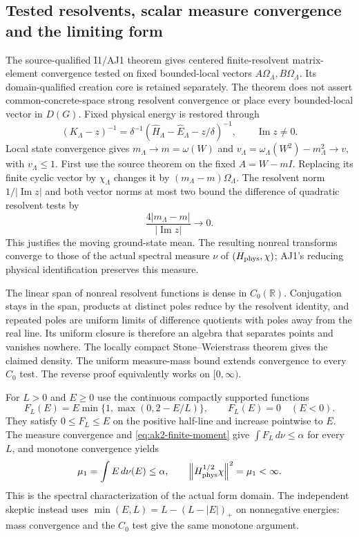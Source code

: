 \subsection{Tested resolvents, scalar measure convergence and the limiting form}
The source-qualified I1/AJ1 theorem gives centered finite-resolvent matrix-element convergence tested on fixed bounded-local vectors $A\Omega_\Lambda,B\Omega_\Lambda$. Its domain-qualified creation core is retained separately. The theorem does not assert common-concrete-space strong resolvent convergence or place every bounded-local vector in $D(G)$. Fixed physical energy is restored through
\begin{equation}
 (K_\Lambda-z)^{-1}=\delta^{-1}
  (\widehat H_\Lambda-\widehat E_\Lambda-z/\delta)^{-1},
 \qquad\operatorname{Im}z\ne0.
 \label{eq:ak2-rescale}
\end{equation}
Local state convergence gives $m_\Lambda\to m=\omega(W)$ and $v_\Lambda=\omega_\Lambda(W^2)-m_\Lambda^2\to v$, with $v_\Lambda\le1$. First use the source theorem on the fixed $A=W-mI$. Replacing its finite cyclic vector by $\chi_\Lambda$ changes it by $(m_\Lambda-m)\Omega_\Lambda$. The resolvent norm $1/|\operatorname{Im}z|$ and both vector norms at most two bound the difference of quadratic resolvent tests by
\begin{equation}
 \frac{4|m_\Lambda-m|}{|\operatorname{Im}z|}\longrightarrow0.
 \label{eq:ak2-moving-center}
\end{equation}
This justifies the moving ground-state mean. The resulting nonreal transforms converge to those of the actual spectral measure $\nu$ of $(H_{\rm phys},\chi)$; AJ1's reducing physical identification preserves this measure.

The linear span of nonreal resolvent functions is dense in $C_0(\mathbb R)$. Conjugation stays in the span, products at distinct poles reduce by the resolvent identity, and repeated poles are uniform limits of difference quotients with poles away from the real line. Its uniform closure is therefore an algebra that separates points and vanishes nowhere. The locally compact Stone--Weierstrass theorem gives the claimed density. The uniform measure-mass bound extends convergence to every $C_0$ test. The reverse proof equivalently works on $[0,\infty)$.

For $L>0$ and $E\ge0$ use the continuous compactly supported functions
\begin{equation}
 F_L(E)=E\min\{1,\max(0,2-E/L)\},\qquad F_L(E)=0\quad(E<0).
\end{equation}
They satisfy $0\le F_L\le E$ on the positive half-line and increase pointwise to $E$. The measure convergence and \eqref{eq:ak2-finite-moment} give $\int F_L\,d\nu\le\alpha$ for every $L$, and monotone convergence yields
\begin{equation}
 \mu_1=\int E\,d\nu(E)\le\alpha,
 \qquad\left\lVert H_{\rm phys}^{1/2}\chi\right\rVert^2=\mu_1<\infty.
 \label{eq:ak2-limit-moment}
\end{equation}
This is the spectral characterization of the actual form domain. The independent skeptic instead uses $\min(E,L)=L-(L-|E|)_+$ on nonnegative energies: mass convergence and the $C_0$ test give the same monotone argument.

